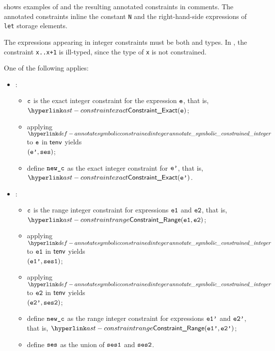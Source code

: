  shows examples of \wellconstrainedintegertypes{}
and the resulting annotated constraints in comments.
The annotated constraints inline the constant \texttt{N} and the right-hand-side
expressions of \texttt{let} storage elements.

The expressions appearing in integer constraints must be both
\symbolicallyevaluable{} and \constrainedinteger{} types.
%
In , the constraint
\verb|x..x+1| is ill-typed, since the type of \texttt{x} is not constrained.

\ProseParagraph
One of the following applies:
\begin{itemize}
  \item {}:
  \begin{itemize}
    \item $\texttt{c}$ is the exact integer constraint for the expression $\texttt{e}$, that is, \\ $\ConstraintExact(\ve)$;
    \item applying $\annotatesymbolicconstrainedinteger$ to $\texttt{e}$ in $\textsf{tenv}$ yields \\
          $(\texttt{e'}, \texttt{ses})$\ProseOrTypeError;
    \item define $\texttt{new\_c}$ as the exact integer constraint for $\texttt{e'}$, that is, $\ConstraintExact(\vep)$.
  \end{itemize}

  \item {}:
  \begin{itemize}
    \item $\texttt{c}$ is the range integer constraint for expressions $\texttt{e1}$ and $\texttt{e2}$, that is, \\ $\ConstraintRange(\veone, \vetwo)$;
    \item applying $\annotatesymbolicconstrainedinteger$ to $\texttt{e1}$ in $\textsf{tenv}$ yields\\ $(\texttt{e1'}, \texttt{ses1})$\ProseOrTypeError;
    \item applying $\annotatesymbolicconstrainedinteger$ to $\texttt{e2}$ in $\textsf{tenv}$ yields\\ $(\texttt{e2'}, \texttt{ses2})$\ProseOrTypeError;
    \item define $\texttt{new\_c}$ as the range integer constraint for expressions $\texttt{e1'}$ and $\texttt{e2'}$, that is, $\ConstraintRange(\veonep, \vetwop)$;
    \item define $\texttt{ses}$ as the union of $\texttt{ses1}$ and $\texttt{ses2}$.
  \end{itemize}
\end{itemize}


